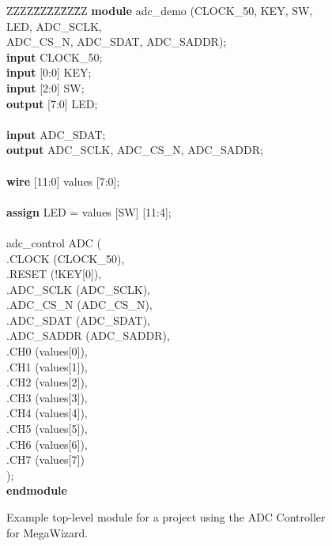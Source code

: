 \begin{figure}[h]

\begin{center} %
\parbox{12.5cm}{
\begin{tabbing}
ZZZZ\=ZZ\=ZZ\=ZZ\=ZZ\kill
{\bf module} adc\_demo (CLOCK\_50, KEY, SW, LED, ADC\_SCLK, \\
\>\>\>\>ADC\_CS\_N, ADC\_SDAT, ADC\_SADDR);\\
\> {\bf input} CLOCK\_50;\\
\> {\bf input} [0:0] KEY;\\
\> {\bf input} [2:0] SW;\\
\> {\bf output} [7:0] LED;\\
\\
\> {\bf input} ADC\_SDAT;\\
\> {\bf output}  ADC\_SCLK, ADC\_CS\_N, ADC\_SADDR;\\
\\
\> {\bf wire} [11:0] values [7:0];\\
\\
\> {\bf assign} LED = values [SW] [11:4];\\
\\
\>\>adc\_control ADC (\\
\>\>\>.CLOCK (CLOCK\_50),\\
\>\>\>.RESET (!KEY[0]),\\
\>\>\>.ADC\_SCLK (ADC\_SCLK),\\
\>\>\>.ADC\_CS\_N (ADC\_CS\_N),\\
\>\>\>.ADC\_SDAT (ADC\_SDAT),\\
\>\>\>.ADC\_SADDR (ADC\_SADDR),\\
\>\>\>.CH0 (values[0]),\\
\>\>\>.CH1 (values[1]),\\
\>\>\>.CH2 (values[2]),\\
\>\>\>.CH3 (values[3]),\\
\>\>\>.CH4 (values[4]),\\
\>\>\>.CH5 (values[5]),\\
\>\>\>.CH6 (values[6]),\\
\>\>\>.CH7 (values[7])\\
\>\>);\\
{\bf endmodule}
\end{tabbing} } %
	\caption{Example top-level module for a project using the ADC Controller for MegaWizard.}
	\label{fig:mega_top}
\end{center}
\end{figure}
